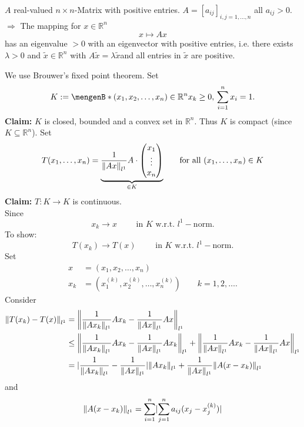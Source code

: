 \begin{theorem}
	$A$ real-valued $n \times n$-Matrix with positive entries. $A = [a_{ij}]_{i,j=1, \dots,n}$ all $a_{ij}>0$. \\
	$\Rightarrow $ The mapping for $x \in \mathbb{R}^n$ 
	\[
		x \mapsto Ax
	\]
	has an eigenvalue $>0$ with an eigenvector with positive entries, i.e. there exists $\lambda >0$ and $\tilde x \in \mathbb{R}^n$ with $A \tilde x = \lambda \tilde x$and all entries in $\tilde x$ are positive.
\end{theorem}

\begin{beweis}
We use Brouwer's fixed point theorem. Set \[
	K := \set[(x_1,x_2,\dots,x_n) \in \mathbb{R}^n]{x_k \geq 0, \, \sum^{n}_{i=1} x_i = 1}.
\]	
\textbf{Claim:} \text{    }     $K$ is closed, bounded and a convex set in $\mathbb{R}^n$. Thus $K$ is compact (since $K \subseteq \mathbb{R}^n$). Set
\[
	T(x_1,\dots,x_n) = \underset{\in K}{\underbrace{\frac{1}{\norm{Ax}_{l^1}}A \cdot \begin{pmatrix}
		x_1 \\ \vdots \\ x_n
	\end{pmatrix}}} \qquad \text{for all }(x_1,\dots,x_n) \in K
\]
\textbf{Claim:} \text{    }     $T: K \to K$ is continuous. \\
Since
\[
	x_k \to x \qquad \text{ in } K \text{ w.r.t. }l^1-\text{norm}.
\]
To show:
\[
	T(x_k) \to T(x) \qquad \text{ in } K \text{ w.r.t. }l^1-\text{norm}.
\]
Set
\begin{align*}
	x &= (x_1,x_2, \dots,x_n) \\
	x_k &= (x_1^{(k)},x_2^{(k)}, \dots, x_n^{(k)}) \qquad k = 1,2,\dots.
\end{align*}
Consider
\begin{align*}
	\norm{T(x_k)-T(x)}_{l^1} &= \norm{ \frac{1}{\norm{Ax_k}_{l^1}} A x_k - \frac{1}{\norm{Ax}_{l^1}} A x }_{l^1} \\
	&\leq  \norm{\frac{1}{\norm{Ax_k}_{l^1}} A x_k - \frac{1}{\norm{Ax}_{l^1}} A x_k}_{l^1} + \norm{\frac{1}{\norm{Ax}_{l^1}} A x_k - \frac{1}{\norm{Ax}_{l^1}} A x}_{l^1} \\
	&= \abs{\frac{1}{\norm{Ax_k}_{l^1}} - \frac{1}{\norm{Ax}_{l^1}}} \norm{A x_k}_{l^1} + \frac{1}{\norm{Ax}_{l^1}} \norm{A(x -x_k)}_{l^1}
\end{align*}
and
\begin{align*}
	\norm{A(x-x_k)}_{l^1} &= \sum^{n}_{i=1} \abs{ \sum^{n}_{j=1} a_{ij}(x_j-x_j^{(k)})} \\

\end{align*}
\end{beweis}
